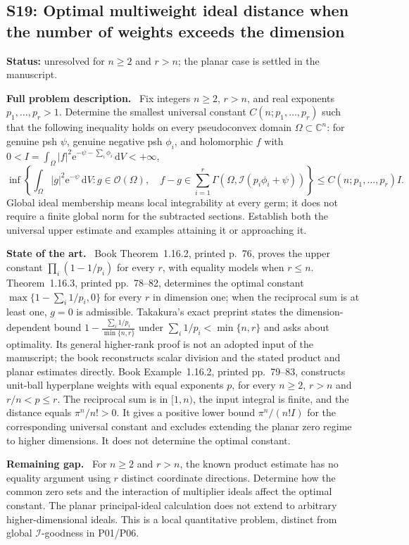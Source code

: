 \documentclass[11pt]{article}
\newcommand{\field}[1]{\par\medskip\noindent\textbf{#1.}\ }
\begin{document}
\subsection{S19: Optimal multiweight ideal distance when the number of weights exceeds the dimension}
\label{S19}
\noindent\textbf{Status:} unresolved for $n\geq2$ and $r>n$; the planar case is settled in the manuscript.
\field{Full problem description} Fix integers $n\geq2$, $r>n$, and real exponents $p_1,\ldots,p_r>1$. Determine the smallest universal constant $C(n;p_1,\ldots,p_r)$ such that the following inequality holds on every pseudoconvex domain $\Omega\subset\mathbb C^n$: for genuine psh $\psi$, genuine negative psh $\phi_i$, and holomorphic $f$ with $0<I=\int_\Omega|f|^2\mathrm e^{-\psi-\sum_i\phi_i}\,\mathrm dV<+\infty$,
\[
 \inf\left\{\int_\Omega|g|^2\mathrm e^{-\psi}\,\mathrm dV:
       g\in\mathcal O(\Omega),\quad
       f-g\in\sum_{i=1}^r\Gamma(\Omega,\mathcal I(p_i\phi_i+\psi))\right\}
       \leq C(n;p_1,\ldots,p_r)I.
\]
Global ideal membership means local integrability at every germ; it does not require a finite global norm for the subtracted sections. Establish both the universal upper estimate and examples attaining it or approaching it.
\field{State of the art} Book Theorem~1.16.2, printed p.~76, proves the upper constant $\prod_i(1-1/p_i)$ for every $r$, with equality models when $r\leq n$. Theorem~1.16.3, printed pp.~78--82, determines the optimal constant $\max\{1-\sum_i1/p_i,0\}$ for every $r$ in dimension one; when the reciprocal sum is at least one, $g=0$ is admissible. Takakura's exact preprint \cite[v1, Theorem~1.2 and Example~3.2, pp.~1--2 and 7]{TakDivision26} states the dimension-dependent bound $1-\frac{\sum_i1/p_i}{\min\{n,r\}}$ under $\sum_i1/p_i<\min\{n,r\}$ and asks about optimality. Its general higher-rank proof is not an adopted input of the manuscript; the book reconstructs scalar division and the stated product and planar estimates directly.
Book Example~1.16.2, printed pp.~79--83, constructs unit-ball hyperplane weights with equal exponents $p$, for every $n\geq2$, $r>n$ and $r/n<p\leq r$. The reciprocal sum is in $[1,n)$, the input integral is finite, and the distance equals $\pi^n/n!>0$. It gives a positive lower bound $\pi^n/(n!I)$ for the corresponding universal constant and excludes extending the planar zero regime to higher dimensions. It does not determine the optimal constant.
\field{Remaining gap} For $n\geq2$ and $r>n$, the known product estimate has no equality argument using $r$ distinct coordinate directions. Determine how the common zero sets and the interaction of multiplier ideals affect the optimal constant. The planar principal-ideal calculation does not extend to arbitrary higher-dimensional ideals. This is a local quantitative problem, distinct from global $\mathcal I$-goodness in P01/P06.
\end{document}
